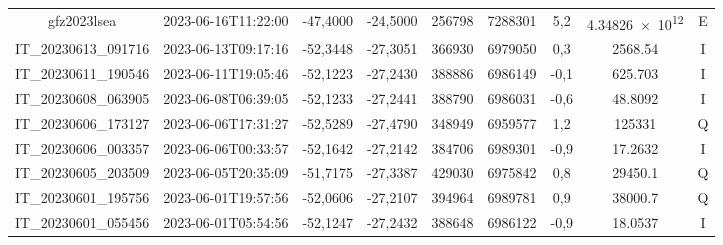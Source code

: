 \begin{center}
\begin{longtable}{ccccS[table-format=6.0]S[table-format=7.0]ccc}
gfz2023lsea & 2023-06-16T11:22:00 & -47,4000 & -24,5000 & 256798 & 7288301 & 5,2 & \num[round-precision=3,round-mode=figures,scientific-notation=true]{4.34826e+12} & E \\
IT\_20230613\_091716 & 2023-06-13T09:17:16 & -52,3448 & -27,3051 & 366930 & 6979050 & 0,3 & \num[round-precision=3,round-mode=figures,scientific-notation=true]{2568.54} & I \\
IT\_20230611\_190546 & 2023-06-11T19:05:46 & -52,1223 & -27,2430 & 388886 & 6986149 & -0,1 & \num[round-precision=3,round-mode=figures,scientific-notation=true]{625.703} & I \\
IT\_20230608\_063905 & 2023-06-08T06:39:05 & -52,1233 & -27,2441 & 388790 & 6986031 & -0,6 & \num[round-precision=3,round-mode=figures,scientific-notation=true]{48.8092} & I \\
IT\_20230606\_173127 & 2023-06-06T17:31:27 & -52,5289 & -27,4790 & 348949 & 6959577 & 1,2 & \num[round-precision=3,round-mode=figures,scientific-notation=true]{125331} & Q \\
IT\_20230606\_003357 & 2023-06-06T00:33:57 & -52,1642 & -27,2142 & 384706 & 6989301 & -0,9 & \num[round-precision=3,round-mode=figures,scientific-notation=true]{17.2632} & I \\
IT\_20230605\_203509 & 2023-06-05T20:35:09 & -51,7175 & -27,3387 & 429030 & 6975842 & 0,8 & \num[round-precision=3,round-mode=figures,scientific-notation=true]{29450.1} & Q \\
IT\_20230601\_195756 & 2023-06-01T19:57:56 & -52,0606 & -27,2107 & 394964 & 6989781 & 0,9 & \num[round-precision=3,round-mode=figures,scientific-notation=true]{38000.7} & Q \\
IT\_20230601\_055456 & 2023-06-01T05:54:56 & -52,1247 & -27,2432 & 388648 & 6986122 & -0,9 & \num[round-precision=3,round-mode=figures,scientific-notation=true]{18.0537} & I \\
\end{longtable}
\end{center}
